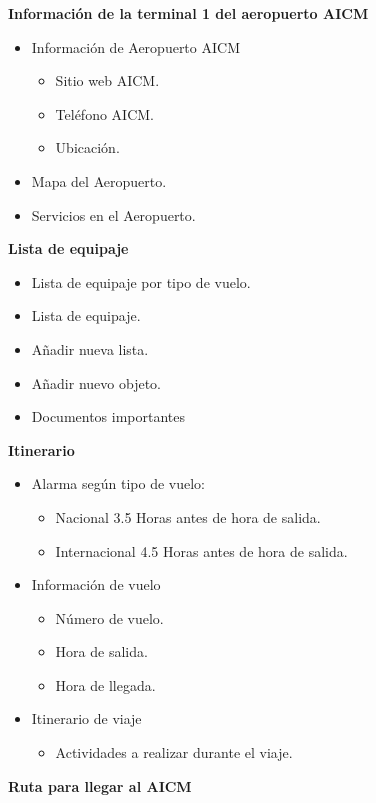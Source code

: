 \textbf{Información de la terminal 1 del aeropuerto AICM}

\begin{itemize}
	\item Información de Aeropuerto AICM
	\begin{itemize}
		 \item Sitio web AICM.
		\item Teléfono AICM.
		\item Ubicación.
	\end{itemize}
	\item Mapa del Aeropuerto.
	\item	Servicios en el Aeropuerto.
\end{itemize}

\textbf{Lista de equipaje}

\begin{itemize}
	\item 	Lista de equipaje por tipo de vuelo.
	\item Lista de equipaje.
	\item Añadir nueva lista.
	\item Añadir nuevo objeto.
	\item Documentos importantes
\end{itemize}
	
\textbf{Itinerario}

\begin{itemize}
	\item Alarma según tipo de vuelo:
	\begin{itemize}
		\item Nacional 3.5 Horas antes de hora de salida.
		\item Internacional 4.5 Horas antes de hora de salida.
	\end{itemize}
	\item Información de vuelo
	\begin{itemize}
		\item Número de vuelo.
		\item Hora de salida.
		\item Hora de llegada.
	\end{itemize}
	\item Itinerario de viaje
	\begin{itemize}
	 \item Actividades a realizar durante el viaje.
	\end{itemize}
\end{itemize}

\textbf{Ruta para llegar al AICM}


